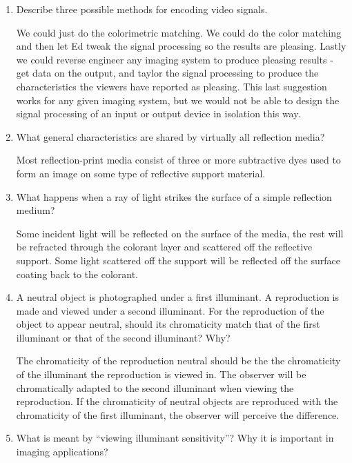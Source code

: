 \begin{enumerate}
 \item
 Describe three possible methods for encoding video signals. \newline
 \par We could just do the colorimetric matching.  We could do the color matching and then let Ed tweak the signal processing so the results are pleasing.  Lastly we could reverse engineer any imaging system to produce pleasing results - get data on the output, and taylor the signal processing to produce the characteristics the viewers have reported as pleasing.  This last suggestion works for any given imaging system, but we would not be able to design the signal processing of an input or output device in isolation this way.
 \item
  What general characteristics are shared by virtually all reflection media? \newline
 \par  Most reflection-print media consist of three or more subtractive dyes used to form an image on some type of reflective support material. \newline
 \item
  What happens when a ray of light strikes the surface of a simple reflection medium? \newline
 \par Some incident light will be reflected on the surface of the media, the rest will be refracted through the colorant layer and scattered off the reflective support. Some light scattered off the support will be reflected off the surface coating back to the colorant. \newline
 \item
  A neutral object is photographed under a first illuminant. A reproduction is made and viewed under a second illuminant. For the reproduction of the object to appear neutral, should its chromaticity match that of the first illuminant or that of the second illuminant? Why? \newline
 \par The chromaticity of the reproduction neutral should be the the chromaticity of the illuminant the reproduction is viewed in.  The observer will be chromatically adapted to the second illuminant when viewing the reproduction.  If the chromaticity of neutral objects are reproduced with the chromaticity of the first illuminant, the observer will perceive the difference. \newline
 \item
  What is meant by “viewing illuminant sensitivity”? Why it is important in imaging applications? \newline

\end{enumerate}
